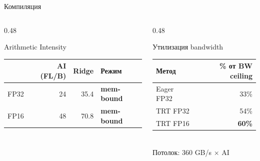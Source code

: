 \documentclass[aspectratio=169,11pt]{beamer}
\begin{document}
\begin{frame}{Компиляция}
  \begin{columns}[T]
    \begin{column}{0.48\textwidth}
      \begin{block}{Arithmetic Intensity}
        \scriptsize\renewcommand{\arraystretch}{1.12}
        \begin{tabular}{@{}lrrl@{}}
          \toprule
          & AI (FL/B) & Ridge & Режим \\
          \midrule
          FP32      & 24  & 35.4 & \textbf{mem-bound} \\
          FP16      & 48  & 70.8 & \textbf{mem-bound} \\
          \bottomrule
        \end{tabular}
      \end{block}
      
    \end{column}
    \begin{column}{0.48\textwidth}
      \begin{exampleblock}{Утилизация bandwidth}
        \scriptsize\renewcommand{\arraystretch}{1.15}
        \begin{tabular}{@{}lr@{}}
          \toprule
          \textbf{Метод} & \textbf{\% от BW ceiling} \\
          \midrule
          Eager FP32  & 33\% \\
          TRT FP32    & 54\% \\
          TRT FP16    & \textbf{60\%} \\
          \bottomrule
        \end{tabular}
        \vspace{0.3em}\\
        Потолок: 360 GB/s $\times$ AI
      \end{exampleblock}
    \end{column}
  \end{columns}
\end{frame}
\end{document}
